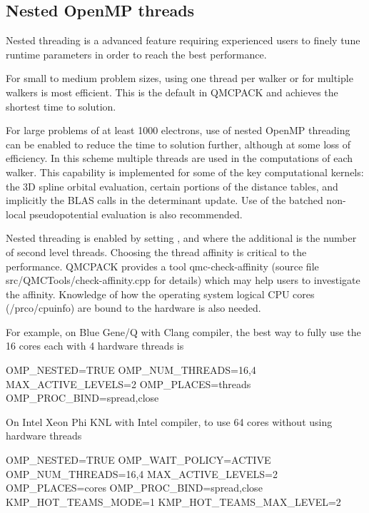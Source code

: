 \subsection{Nested OpenMP threads}
Nested threading is a advanced feature requiring experienced users to finely tune runtime parameters in order to reach the best performance.  

For small to medium problem sizes, using one thread per walker or for multiple walkers is most efficient. This is the default in QMCPACK and achieves the shortest time to solution.

For large problems of at least 1000 electrons, use of nested OpenMP threading can be enabled to reduce the time to solution further, although at some loss of efficiency. In this scheme multiple threads are used in the computations of each walker. This capability is implemented for some of the key computational kernels: the 3D spline orbital evaluation, certain portions of the distance tables, and implicitly the BLAS calls in the determinant update. Use of the batched non-local pseudopotential evaluation is also recommended.

Nested threading is enabled by setting ,  and  where the additional  is the number of second level threads.  Choosing the thread affinity is critical to the performance.  QMCPACK provides a tool qmc-check-affinity (source file src/QMCTools/check-affinity.cpp for details) which may help users to investigate the affinity. Knowledge of how the operating system logical CPU cores (/prco/cpuinfo) are bound to the hardware is also needed.

For example, on Blue Gene/Q with Clang compiler, the best way to fully use the 16 cores each with 4 hardware threads is
\begin{shade}
OMP_NESTED=TRUE
OMP_NUM_THREADS=16,4
MAX_ACTIVE_LEVELS=2
OMP_PLACES=threads
OMP_PROC_BIND=spread,close
\end{shade}

On Intel Xeon Phi KNL with Intel compiler, to use 64 cores without using hardware threads
\begin{shade}
OMP_NESTED=TRUE
OMP_WAIT_POLICY=ACTIVE
OMP_NUM_THREADS=16,4
MAX_ACTIVE_LEVELS=2
OMP_PLACES=cores
OMP_PROC_BIND=spread,close
KMP_HOT_TEAMS_MODE=1
KMP_HOT_TEAMS_MAX_LEVEL=2
\end{shade}

